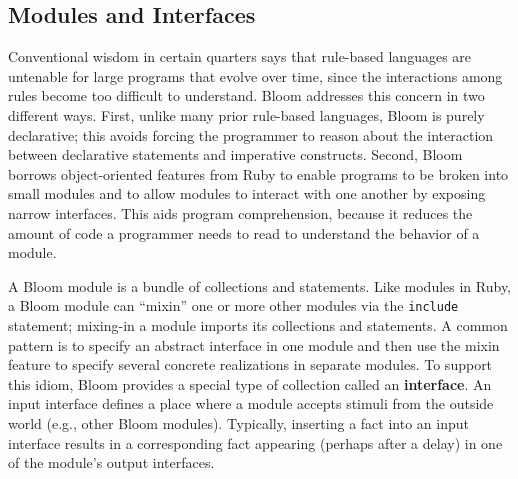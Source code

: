 \begin{comment}
The constructs above form the core of the Bloom language.
Bud also includes some additional convenience methods that provide macros over
these methods and allows the use of simple side-effect-free Ruby expressions
within statements.
\end{comment}

\subsection{Modules and Interfaces}
\label{sec:modularity}
Conventional wisdom in certain quarters says that rule-based languages are
untenable for large programs that evolve over time, since the interactions among
rules become too difficult to understand.  Bloom addresses this concern in two
different ways. First, unlike many prior rule-based languages, Bloom is purely
declarative; this avoids forcing the programmer to reason about the interaction
between declarative statements and imperative constructs. Second, Bloom borrows
object-oriented features from Ruby to enable programs to be broken into small
modules and to allow modules to interact with one another by exposing narrow
interfaces. This aids program comprehension, because it reduces the amount of
code a programmer needs to read to understand the behavior of a module.

A Bloom module is a bundle of collections and statements. Like modules in Ruby,
a Bloom module can ``mixin'' one or more other modules via the \texttt{include}
statement; mixing-in a module imports its collections and statements. A common
pattern is to specify an abstract interface in one module and then use the mixin
feature to specify several concrete realizations in separate modules. To support
this idiom, Bloom provides a special type of collection called an
\textbf{interface}. An input interface defines a place where a module accepts
stimuli from the outside world (e.g., other Bloom modules). Typically, inserting
a fact into an input interface results in a corresponding fact appearing
(perhaps after a delay) in one of the module's output interfaces.

